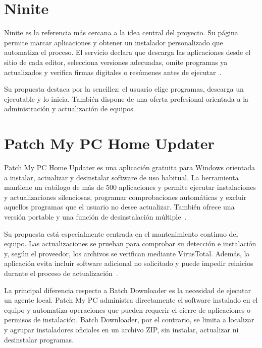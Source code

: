 
\section{Ninite}

Ninite es la referencia más cercana a la idea central del proyecto. Su página permite marcar aplicaciones y obtener un instalador personalizado que automatiza el proceso. El servicio declara que descarga las aplicaciones desde el sitio de cada editor, selecciona versiones adecuadas, omite programas ya actualizados y verifica firmas digitales o resúmenes antes de ejecutar~\cite{ninite}.

Su propuesta destaca por la sencillez: el usuario elige programas, descarga un ejecutable y lo inicia. También dispone de una oferta profesional orientada a la administración y actualización de equipos.

\section{Patch My PC Home Updater}

Patch My PC Home Updater es una aplicación gratuita para Windows orientada a instalar, actualizar y desinstalar software de uso habitual. La herramienta mantiene un catálogo de más de 500 aplicaciones y permite ejecutar instalaciones y actualizaciones silenciosas, programar comprobaciones automáticas y excluir aquellos programas que el usuario no desee actualizar. También ofrece una versión portable y una función de desinstalación múltiple~\cite{patchmypc-home-updater}.

Su propuesta está especialmente centrada en el mantenimiento continuo del equipo. Las actualizaciones se prueban para comprobar su detección e instalación y, según el proveedor, los archivos se verifican mediante VirusTotal. Además, la aplicación evita incluir software adicional no solicitado y puede impedir reinicios durante el proceso de actualización~\cite{patchmypc-home-updater}.

La principal diferencia respecto a Batch Downloader es la necesidad de ejecutar un agente local. Patch My PC administra directamente el software instalado en el equipo y automatiza operaciones que pueden requerir el cierre de aplicaciones o permisos de instalación. Batch Downloader, por el contrario, se limita a localizar y agrupar instaladores oficiales en un archivo ZIP, sin instalar, actualizar ni desinstalar programas.

